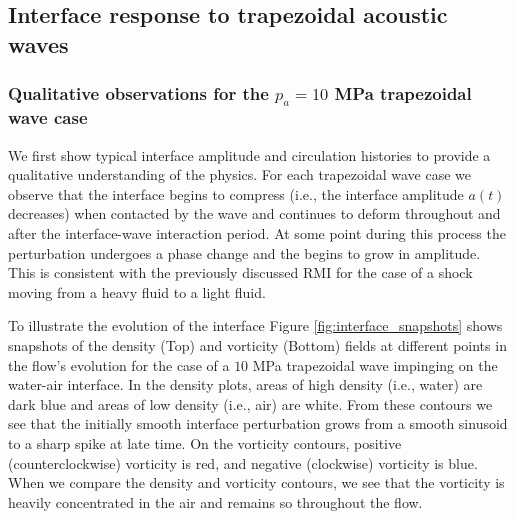 \subsection{Interface response to trapezoidal acoustic waves} \label{subsec:usbe_lung_trapz_results}
\subsubsection{Qualitative observations for the $p_a=10$ MPa trapezoidal wave case}
We first show typical interface amplitude and circulation histories to
provide a qualitative understanding of the physics. For each
trapezoidal wave case we observe that the interface begins to compress
(i.e., the interface amplitude $a(t)$ decreases) when contacted by the
wave and continues to deform throughout and after the interface-wave
interaction period. At some point during this process the perturbation
undergoes a phase change and the begins to grow in amplitude. This is
consistent with the previously discussed \ac{RMI} for the case of a
shock moving from a heavy fluid to a light fluid.

To illustrate the evolution of the interface Figure
\ref{fig:interface_snapshots} shows snapshots of the density (Top) and
vorticity (Bottom) fields at different points in the flow's evolution
for the case of a $10$ MPa trapezoidal wave impinging on the water-air
interface. In the density plots, areas of high density (i.e., water)
are dark blue and areas of low density (i.e., air) are white. From
these contours we see that the initially smooth interface perturbation
grows from a smooth sinusoid to a sharp spike at late time. On the
vorticity contours, positive (counterclockwise) vorticity is red, and
negative (clockwise) vorticity is blue.  When we compare the density
and vorticity contours, we see that the vorticity is heavily
concentrated in the air and remains so throughout the flow.

